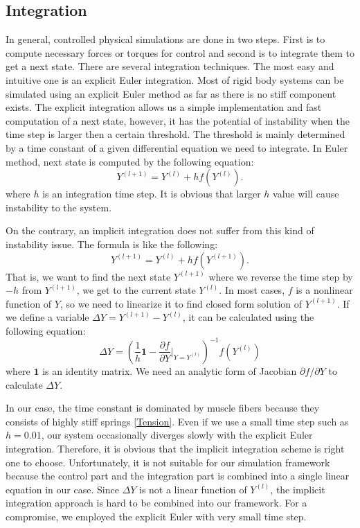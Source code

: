 \documentclass{acm_proc_article-sp}
\begin{document}
\subsection{Integration}
In general, controlled physical simulations are done in two steps.
First is to compute necessary forces or torques for control and
second is to integrate them to get a next state.
There are several integration techniques.
The most easy and intuitive one is an explicit Euler integration.
Most of rigid body systems can be simulated using an explicit Euler method
as far as there is no stiff component exists. The explicit integration
allows us a simple implementation and fast computation of a next state,
however, it has the potential of instability when the time step is larger
then a certain threshold. The threshold is mainly determined by a time
constant of a given differential equation we need to integrate.
In Euler method, next state is computed by the following equation:
\begin{equation}
Y^{(l+1)}=Y^{(l)} + hf(Y^{(l)}).
\end{equation}
where $h$ is an integration time step.
It is obvious that larger $h$ value will cause instability to the system.

On the contrary, an implicit integration does not suffer from this kind of
instability issue. The formula is like the following:
\begin{equation}
Y^{(l+1)}=Y^{(l)} + hf(Y^{(l+1)}).
\end{equation}
That is, we want to find the next state $Y^{(l+1)}$ where we
reverse the time step by $-h$ from $Y^{(l+1)}$, we get to the current state
$Y^{(l)}$. In most cases, $f$ is a nonlinear function of $Y$, so we need to
linearize it to find closed form solution of $Y^{(l+1)}$. If we define a
variable $\Delta Y = Y^{(l+1)}-Y^{(l)}$, it can be calculated using the
following equation:
\begin{equation}\label{DeltaY}
\Delta Y = \left(  \frac{1}{h}\mathbf{1} - {\frac{\partial f}{\partial Y} \bigg|_{Y=Y^{(l)}}}\right)^{-1} f(Y^{(l)})
\end{equation}
where $\mathbf{1}$ is an identity matrix. We need an analytic form of
Jacobian $\partial f / \partial Y$ to calculate $\Delta Y$.

In our case, the time constant is dominated by muscle fibers because they consists
of highly stiff springs \eqref{Tension}. Even if we use a small time step
such as $h=0.01$, our system occasionally diverges slowly with the explicit Euler
integration. Therefore, it is obvious that the implicit integration scheme is right one to choose.
Unfortunately, it is not suitable for our simulation framework because
the control part and the integration part is combined into a single linear equation in our case.
Since $\Delta Y$ is not a linear function of $Y^{(l)}$, the implicit integration approach
is hard to be combined into our framework. For a compromise, we employed the explicit Euler
with very small time step.
\end{document}
